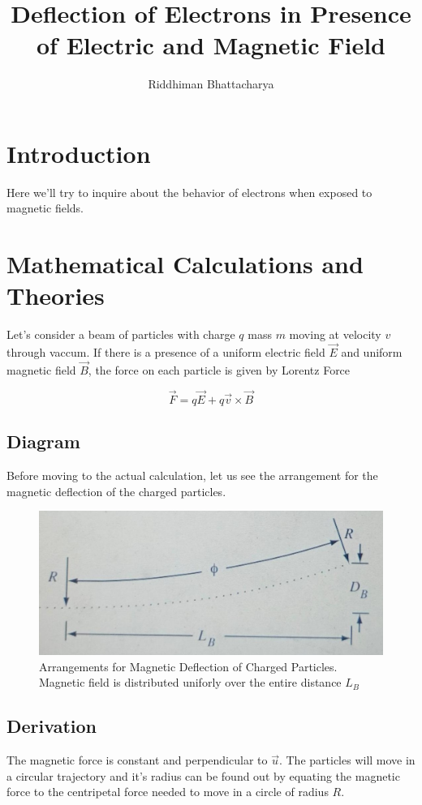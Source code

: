 \documentclass{article}
\title{\textbf{Deflection of Electrons in Presence of Electric and Magnetic Field}}
\author{Riddhiman Bhattacharya}
\begin{document}
\maketitle



\section{\Large Introduction}
\large

Here we'll try to inquire about the behavior of electrons when exposed to magnetic fields.

\section{\Large Mathematical Calculations and Theories}
\large


Let's consider a beam of particles with charge $q$ mass $m$ moving at velocity $v$ through vaccum. If there is a presence of a uniform electric field $\vec{E}
$ and uniform magnetic field $\vec{B}
$, the force on each particle is given by Lorentz Force 

$$ \vec{F}=q\vec{E}+ q\vec{v} \times \vec{B} $$

\subsection{\Large Diagram}
\large

Before moving to the actual calculation, let us see the arrangement for the magnetic deflection of the charged particles.

\begin{figure}
\centering
\includegraphics[width=0.5\linewidth]{Deflection of Electrons.jpeg}
\caption{Arrangements for Magnetic Deflection of Charged Particles. Magnetic field is distributed uniforly over the entire distance $L_B$}

\end{figure}
\subsection{\Large Derivation}
\large 
The magnetic force is constant and perpendicular to $\vec{u}$. The particles will
move in a circular trajectory and it's radius can be found out by equating the magnetic force to the centripetal
force needed to move in a circle of radius $R$.
\end{document}
